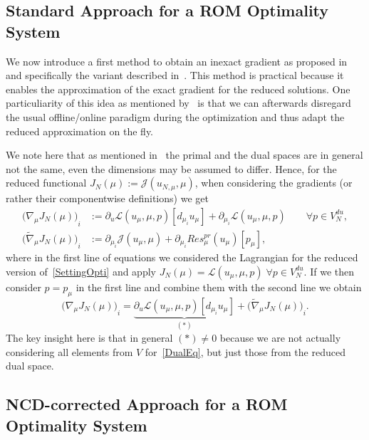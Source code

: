 \subsection{Standard Approach for a ROM Optimality System}

We now introduce a first method to obtain an inexact gradient as proposed in~\cite{Qian2017} and specifically the variant described in~\cite[Subsection 3.2]{Keil2021}.
This method is practical because it enables the approximation of the exact gradient for the reduced solutions.
One particuliarity of this idea as mentioned by~\cite{Qian2017} is that we can afterwards disregard the usual offline/online paradigm during the optimization and thus adapt the reduced approximation on the fly.

We note here that as mentioned in~\cite[Subsection 3.2]{Keil2021} the primal and the dual spaces are in general not the same, even the dimensions may be assumed to differ.
Hence, for the reduced functional $J_N(\mu) := \mathcal{J}(u_{N, \mu}, \mu)$, when considering the gradients (or rather their componentwise definitions) we get
\begin{align}\label{Grads}
    {\big( \nabla_\mu J_N(\mu) \big)}_i &:= \partial_u \mathcal{L}(u_\mu, \mu, p)[d_{\mu_i} u_\mu] + \partial_{\mu_i} \mathcal{L}(u_\mu, \mu, p) \qquad \forall p \in V_N^{du}, \tag*{(exact)} \\
    {\big( \tilde{\nabla}_\mu J_N(\mu) \big)}_i &:= \partial_{\mu_i} \mathcal{J}(u_\mu, \mu) + \partial_{\mu_i} Res_\mu^{pr}(u_\mu)[p_\mu], \tag*{(inexact)}
\end{align}
where in the first line of equations we considered the Lagrangian for the reduced version of~\eqref{SettingOpti} and apply $J_N(\mu) = \mathcal{L}(u_\mu, \mu, p) \; \forall p \in V_N^{du}$.
If we then consider $p = p_\mu$ in the first line and combine them with the second line we obtain
\begin{equation*}\label{RelationGrads}
    {\big( \nabla_\mu J_N(\mu) \big)}_i = \underbrace{\partial_u \mathcal{L}(u_\mu, \mu, p)[d_{\mu_i} u_\mu]}_{(\ast)} + {\big( \tilde{\nabla}_\mu J_N(\mu) \big)}_i.
\end{equation*}
The key insight here is that in general $(\ast) \neq 0$ because we are not actually considering all elements from $V$ for~\eqref{DualEq}, but just those from the reduced dual space.

\subsection{NCD-corrected Approach for a ROM Optimality System}

